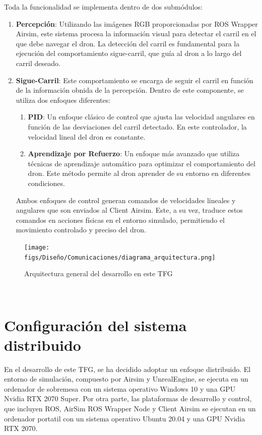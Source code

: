 Toda la funcionalidad se implementa dentro de dos submódulos:
\begin{enumerate}
  \item \textbf{Percepción}: Utilizando las imágenes RGB proporcionadas por ROS Wrapper Airsim, este sistema procesa la información
  visual para detectar el carril en el que debe navegar el dron. La detección del carril es fundamental para la ejecución del comportamiento sigue-carril, que guía al dron 
  a lo largo del carril deseado. 
  \item \textbf{Sigue-Carril}: Este comportamiento se encarga de seguir el carril en función de la información obnida de la percepción. Dentro de este componente, se 
  utiliza dos enfoques diferentes: 
  \begin{enumerate}
    \item \textbf{PID}: Un enfoque clásico de control que ajusta las velocidad angulares en función de las desviaciones del carril detectado. En este controlador, la velocidad lineal 
    del dron es constante.
    \item \textbf{Aprendizaje por Refuerzo}: Un enfoque más avanzado que utiliza técnicas de aprendizaje automático para optimizar el comportamiento del dron. Este método 
    permite al dron aprender de su entorno en diferentes condiciones. 
  \end{enumerate}

  Ambos enfoques de control generan comandos de velocidades lineales y angulares que son enviados al Client Airsim. Este, a su vez, traduce estos comandos en acciones físicas 
  en el entorno simulado, permitiendo el movimiento controlado y preciso del dron. 
\end{enumerate}

\begin{figure} [H]
    \begin{center}
      \texttt{[image: figs/Diseño/Comunicaciones/diagrama\_arquitectura.png]}
    \end{center}
    \caption{Arquitectura general del desarrollo en este TFG}
    \label{fig:infraestructura}
  \end{figure}\

\section{Configuración del sistema distribuido}
\label{distribución}
En el desarrollo de este TFG, se ha decidido adoptar un enfoque distribuido. El entorno de simulación, compuesto por Airsim y UnrealEngine, se ejecuta en un ordenador de sobremesa con un sistema 
operativo Windows 10 y una GPU Nvidia RTX 2070 Super. Por otra parte, las plataformas de desarrollo y control, que incluyen ROS, AirSim ROS Wrapper Node y Client Airsim se ejecutan en un ordenador
portatil con un sistema operativo Ubuntu 20.04 y una GPU Nvidia RTX 2070.

